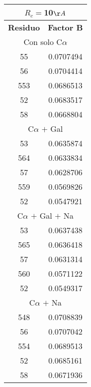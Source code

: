 \begin{tabular}[c]{|c|c|}
\multicolumn{2}{c}{$R_c=$10$\AA$}\\\hline
\textbf{Residuo}&\textbf{Factor B}\\\hline
\multicolumn{2}{c}{Con solo C$\alpha$}\\\hline
        55& 0.0707494\\
        56& 0.0704414\\
       553& 0.0686513\\
        52& 0.0683517\\
        58& 0.0668804\\\hline
\multicolumn{2}{c}{C$\alpha$ $+$ Gal}\\\hline
        53& 0.0635874\\
       564& 0.0633834\\
        57& 0.0628706\\
       559& 0.0569826\\
        52& 0.0547921\\\hline
\multicolumn{2}{c}{C$\alpha$ $+$ Gal $+$ Na}\\\hline
        53& 0.0637438\\
       565& 0.0636418\\
        57& 0.0631314\\
       560& 0.0571122\\
        52& 0.0549317\\\hline
\multicolumn{2}{c}{C$\alpha$ $+$ Na}\\\hline
       548& 0.0708839\\
        56& 0.0707042\\
       554& 0.0689513\\
        52& 0.0685161\\
        58& 0.0671936\\\hline
\end{tabular}
